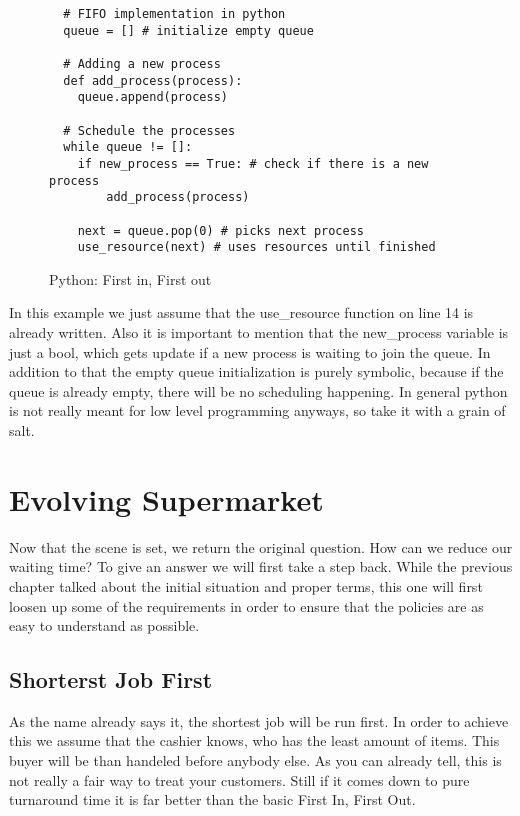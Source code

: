 \begin{figure}[h]
\begin{verbatim}
  # FIFO implementation in python
  queue = [] # initialize empty queue

  # Adding a new process
  def add_process(process):
    queue.append(process)

  # Schedule the processes
  while queue != []:
    if new_process == True: # check if there is a new process
        add_process(process)
    
    next = queue.pop(0) # picks next process
    use_resource(next) # uses resources until finished
\end{verbatim}
\label{code:fifo}
\caption{Python: First in, First out}
\end{figure}
In this example we just assume that the use\_resource function on line 14 is already written.
Also it is important to mention that the new\_process variable is just a bool, which gets update if a new process is waiting to join the queue.
In addition to that the empty queue initialization is purely symbolic, because if the queue is already empty, there will be no scheduling happening. 
In general python is not really meant for low level programming anyways, so take it with a grain of salt.


\chapter{Evolving Supermarket}

Now that the scene is set, we return the original question. 
How can we reduce our waiting time?
To give an answer we will first take a step back.
While the previous chapter talked about the initial situation and proper terms, this one will first loosen up some of the requirements in order to ensure that the policies are as easy to understand as possible.

\section{Shorterst Job First}

As the name already says it, the shortest job will be run first.
In order to achieve this we assume that the cashier knows, who has the least amount of items.
This buyer will be than handeled before anybody else. As you can already tell, this is not really a fair way to treat your customers.
Still if it comes down to pure turnaround time it is far better than the basic First In, First Out.

